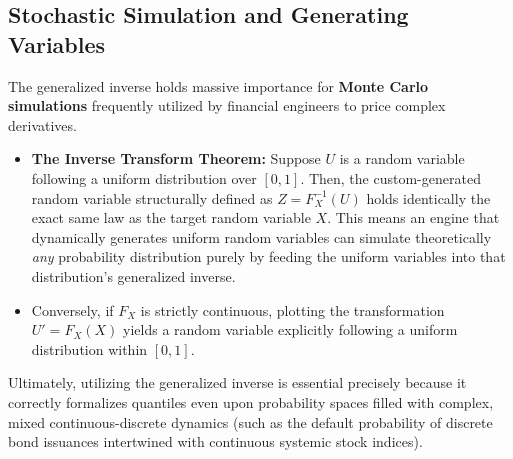 \subsection*{Stochastic Simulation and Generating Variables}
The generalized inverse holds massive importance for \textbf{Monte Carlo simulations} frequently utilized by financial engineers to price complex derivatives.

\begin{itemize}
    \item \textbf{The Inverse Transform Theorem:} Suppose $U$ is a random variable following a uniform distribution over $[0, 1]$. Then, the custom-generated random variable structurally defined as $Z = F_X^{-1}(U)$ holds identically the exact same law as the target random variable $X$. This means an engine that dynamically generates uniform random variables can simulate theoretically \textit{any} probability distribution purely by feeding the uniform variables into that distribution's generalized inverse.
    \item Conversely, if $F_X$ is strictly continuous, plotting the transformation $U' = F_X(X)$ yields a random variable explicitly following a uniform distribution within $[0, 1]$.
\end{itemize}

Ultimately, utilizing the generalized inverse is essential precisely because it correctly formalizes quantiles even upon probability spaces filled with complex, mixed continuous-discrete dynamics (such as the default probability of discrete bond issuances intertwined with continuous systemic stock indices).
